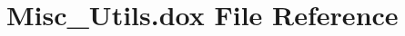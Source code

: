 \hypertarget{_misc___utils_8dox}{}\section{Misc\+\_\+\+Utils.\+dox File Reference}
\label{_misc___utils_8dox}

